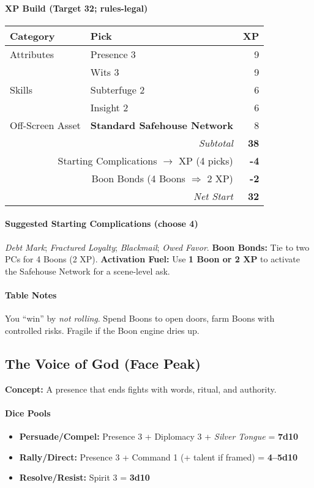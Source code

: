 \documentclass[11pt]{book}
\begin{document}
\paragraph{XP Build (Target 32; rules-legal)}
\begin{tabular}{@{}llr@{}}
\toprule
\textbf{Category} & \textbf{Pick} & \textbf{XP} \\
\midrule
Attributes & Presence 3 & 9 \\
           & Wits 3 & 9 \\
Skills     & Subterfuge 2 & 6 \\
           & Insight 2 & 6 \\
Off-Screen Asset & \textbf{Standard Safehouse Network} & 8 \\
\midrule
\multicolumn{2}{r}{\textit{Subtotal}} & \textbf{38} \\
\multicolumn{2}{r}{Starting Complications $\rightarrow$ XP (4 picks)} & \textbf{-4} \\
\multicolumn{2}{r}{Boon Bonds (4 Boons $\Rightarrow$ 2 XP)} & \textbf{-2} \\
\midrule
\multicolumn{2}{r}{\textit{Net Start}} & \textbf{32} \\
\bottomrule
\end{tabular}

\paragraph{Suggested Starting Complications (choose 4)}
\emph{Debt Mark}; \emph{Fractured Loyalty}; \emph{Blackmail}; \emph{Owed Favor}.  
\textbf{Boon Bonds:} Tie to two PCs for 4 Boons (2 XP).  
\textbf{Activation Fuel:} Use \textbf{1 Boon or 2 XP} to activate the Safehouse Network for a scene-level ask.

\paragraph{Table Notes}
You “win” by \emph{not rolling}. Spend Boons to open doors, farm Boons with controlled risks. Fragile if the Boon engine dries up.

\bigskip

\subsection*{The Voice of God (Face Peak)}
\textbf{Concept:} A presence that ends fights with words, ritual, and authority.

\paragraph{Dice Pools}
\begin{itemize}
  \item \textbf{Persuade/Compel:} Presence 3 + Diplomacy 3 + \emph{Silver Tongue} = \textbf{7d10}
  \item \textbf{Rally/Direct:} Presence 3 + Command 1 (+ talent if framed) = \textbf{4–5d10}
  \item \textbf{Resolve/Resist:} Spirit 3 = \textbf{3d10}
\end{itemize}
\end{document}
